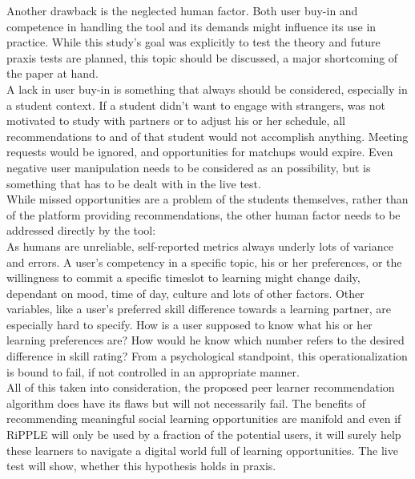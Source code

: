 \documentclass[nochapterpage,bigchapter,linedtoc,longdoc,colorback,accentcolor=tud3b]{tudreport}
\begin{document}
Another drawback is the neglected human factor. Both user buy-in and competence in handling the tool and its demands might influence its use in practice. While this study's goal was explicitly to test the theory and future praxis tests are planned, this topic should be discussed, a major shortcoming of the paper at hand.\\
A lack in user buy-in is something that always should be considered, especially in a student context. If a student didn't want to engage with strangers, was not motivated to study with partners or to adjust his or her schedule, all recommendations to and of that student would not accomplish anything. Meeting requests would be ignored, and opportunities for matchups would expire. Even negative user manipulation needs to be considered as an possibility, but is something that has to be dealt with in the live test.\\
While missed opportunities are a problem of the students themselves, rather than of the platform providing recommendations, the other human factor needs to be addressed directly by the tool:\\
As humans are unreliable, self-reported metrics always underly lots of variance and errors. A user's competency in a specific topic, his or her preferences, or the willingness to commit a specific timeslot to learning might change daily, dependant on mood, time of day, culture and lots of other factors. \cite{lee2002cultural} \cite{sorensen2008measuring} Other variables, like a user's preferred skill difference towards a learning partner, are especially hard to specify. How is a user supposed to know what his or her learning preferences are? How would he know which number refers to the desired difference in skill rating? From a psychological standpoint, this operationalization is bound to fail, if not controlled in an appropriate manner. \cite{gonyea2005self}\\
All of this taken into consideration, the proposed peer learner recommendation algorithm does have its flaws but will not necessarily fail. The benefits of recommending meaningful social learning opportunities are manifold and even if RiPPLE will only be used by a fraction of the potential users, it will surely help these learners to navigate a digital world full of learning opportunities. The live test will show, whether this hypothesis holds in praxis.\\
\end{document}
